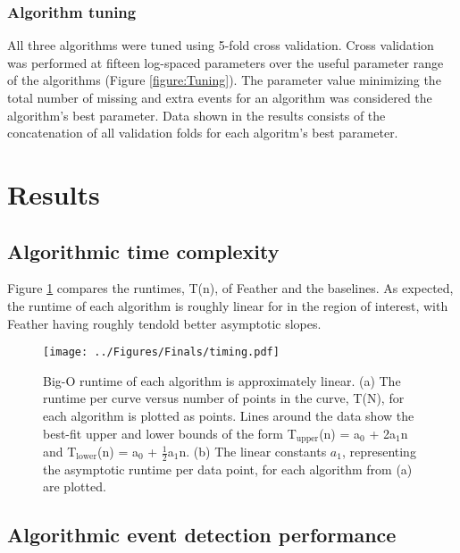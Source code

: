 \documentclass[%
  aip,12pt,tightenlines,
  amsthm,
 amsmath,amssymb
]{article}
\newcommand{\fRef}[1]{Figure \ref{figure:#1}}
\newcommand{\fLabel}[1]{\label{figure:#1}}
\newcommand{\sLabel}[1]{\label{section:#1}}
\newcommand{\firstp}[0]{}
\newcommand{\pl}[0]{\vspace{6pt}}
\newcommand{\pEndF}[0]{ \\ }
\newcommand{\pStartF}[0]{ }
\newcommand{\name}[0]{Feather}
\newcommand{\figwidth}[0]{\linewidth}
\begin{document}
\subsubsection{\sLabel{Tuning}Algorithm tuning }

\firstp All three algorithms were tuned using 5-fold cross validation. Cross validation was performed at fifteen log-spaced parameters over the useful parameter range of the algorithms (\fRef{Tuning}). The parameter value minimizing the total number of missing and extra events for an algorithm was considered the algorithm's best parameter. Data shown in the results consists of the concatenation of all validation folds for each algoritm's best parameter.


\section{\sLabel{Results}Results}

\subsection{\sLabel{Timing}Algorithmic time complexity}

\firstp \fRef{Timing} compares the runtimes, T(n), of \name{} and the baselines. As expected, the runtime of each algorithm is roughly linear for in the region of interest, with \name{} having roughly tendold better asymptotic slopes.  \pl

\begin{figure}
\centering
\texttt{[image: ../Figures/Finals/timing.pdf]}%
\caption[Runtime versus length of curve]{\noindent\fLabel{Timing}\pStartF  Big-O runtime of each algorithm is approximately linear. (a) The runtime per curve versus number of points in the curve, T(N), for each algorithm is plotted as points. Lines around the data show the best-fit upper and lower bounds of the form T$_{\mathrm{upper}}$(n) = a$_0$ + 2a$_1$n  and T$_{\mathrm{lower}}$(n) = a$_0$ + $\frac{1}{2}$a$_1$n. (b) The linear constants $a_1$, representing the asymptotic runtime per data point, for each algorithm from (a) are plotted. \pEndF}
\end{figure}

\subsection{\sLabel{Performance}Algorithmic event detection performance}
\end{document}
